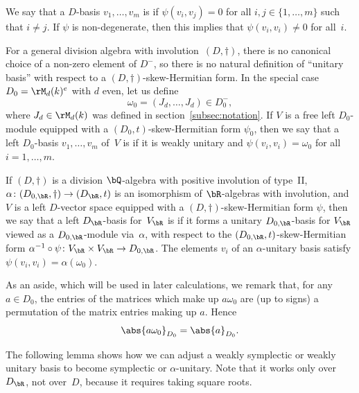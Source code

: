 We say that a $D$-basis $v_1, \dotsc, v_m$ is  if $\psi(v_i, v_j) = 0$ for all $i, j \in \{ 1, \dotsc, m \}$ such that $i \neq j$.
If $\psi$ is non-degenerate, then this implies that $\psi(v_i, v_i) \neq 0$ for all~$i$.

For a general division algebra with involution~$(D,\dag)$, there is no canonical choice of a non-zero element of $D^-$, so there is no natural definition of ``unitary basis'' with respect to a $(D,\dag)$-skew-Hermitian form.
In the special case $D_0 = \rM_d(k)^e$ with $d$ even, let us define
\[
\omega_0 = ( J_d, \dotsc, J_d ) \in D_0^-,
\]
where $J_d \in \rM_d(k)$ was defined in section~\ref{subsec:notation}.
If $V$ is a free left $D_0$-module equipped with a $(D_0,t)$-skew-Hermitian form $\psi_0$, then we say that a left $D_0$-basis $v_1, \dotsc, v_m$ of~$V$ is  if it is weakly unitary and $\psi(v_i, v_i) = \omega_0$ for all $i = 1, \dotsc, m$.

If $(D,\dag)$ is a division $\bQ$-algebra with positive involution of type~II, $\alpha \colon (D_{0,\bR},\dag) \to (D_\bR,t)$ is an isomorphism of $\bR$-algebras with involution, and $V$ is a left $D$-vector space equipped with a $(D,\dag)$-skew-Hermitian form $\psi$, then we say that a left $D_\bR$-basis for~$V_\bR$ is  if it forms a unitary $D_{0,\bR}$-basis for $V_\bR$ viewed as a $D_{0,\bR}$-module via~$\alpha$, with respect to the $(D_{0,\bR},t)$-skew-Hermitian form $\alpha^{-1} \circ \psi \colon V_\bR \times V_\bR \to D_{0,\bR}$.
The elements $v_i$ of an $\alpha$-unitary basis satisfy $\psi(v_i, v_i) = \alpha(\omega_0)$.

As an aside, which will be used in later calculations, we remark that, for any $a \in D_0$, the entries of the matrices which make up $a \omega_0$ are (up to signs) a permutation of the matrix entries making up $a$. Hence
\begin{equation} \label{eqn:a-omega0}
\abs{a\omega_0}_{D_0} = \abs{a}_{D_0}.
\end{equation}

The following lemma shows how we can adjust a weakly symplectic or weakly unitary basis to become symplectic or $\alpha$-unitary. Note that it works only over $D_\bR$, not over~$D$, because it requires taking square roots.

